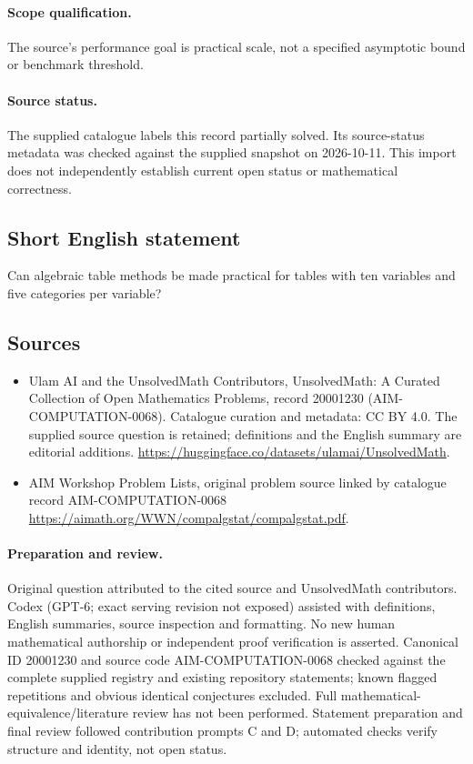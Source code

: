 \documentclass[11pt]{article}
\begin{document}
\paragraph{Scope qualification.}
The source's performance goal is practical scale, not a specified asymptotic bound or benchmark threshold.
\paragraph{Source status.}
The supplied catalogue labels this record partially solved. Its source-status metadata was checked against the supplied snapshot on 2026-10-11. This import does not independently establish current open status or mathematical correctness.
\subsection{Short English statement}
Can algebraic table methods be made practical for tables with ten variables and five categories per variable?
\subsection{Sources}
\begin{itemize}
\item[S1] Ulam AI and the UnsolvedMath Contributors, UnsolvedMath: A Curated Collection of Open Mathematics Problems, record 20001230 (AIM-COMPUTATION-0068). Catalogue curation and metadata: CC BY 4.0. The supplied source question is retained; definitions and the English summary are editorial additions.
\url{https://huggingface.co/datasets/ulamai/UnsolvedMath}.
\item[S2] AIM Workshop Problem Lists, original problem source linked by catalogue record AIM-COMPUTATION-0068
\url{https://aimath.org/WWN/compalgstat/compalgstat.pdf}.
\end{itemize}
\paragraph{Preparation and review.}
Original question attributed to the cited source and UnsolvedMath contributors. Codex (GPT-6; exact serving revision not exposed) assisted with definitions, English summaries, source inspection and formatting. No new human mathematical authorship or independent proof verification is asserted. Canonical ID 20001230 and source code AIM-COMPUTATION-0068 checked against the complete supplied registry and existing repository statements; known flagged repetitions and obvious identical conjectures excluded. Full mathematical-equivalence/literature review has not been performed. Statement preparation and final review followed contribution prompts C and D; automated checks verify structure and identity, not open status.
\label{end:20001230}
\end{document}
